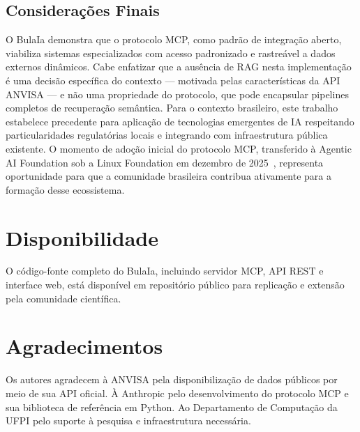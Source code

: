 \documentclass[12pt]{article}
\begin{document}
\subsection{Considerações Finais}

O BulaIa demonstra que o protocolo MCP, como padrão de integração aberto, viabiliza sistemas especializados com acesso padronizado e rastreável a dados externos dinâmicos. Cabe enfatizar que a ausência de RAG nesta implementação é uma decisão específica do contexto --- motivada pelas características da API ANVISA --- e não uma propriedade do protocolo, que pode encapsular pipelines completos de recuperação semântica. Para o contexto brasileiro, este trabalho estabelece precedente para aplicação de tecnologias emergentes de IA respeitando particularidades regulatórias locais e integrando com infraestrutura pública existente. O momento de adoção inicial do protocolo MCP, transferido à Agentic AI Foundation sob a Linux Foundation em dezembro de 2025~\cite{wikipedia2025mcp}, representa oportunidade para que a comunidade brasileira contribua ativamente para a formação desse ecossistema.

\section*{Disponibilidade}

O código-fonte completo do BulaIa, incluindo servidor MCP, API REST e interface web, está disponível em repositório público para replicação e extensão pela comunidade científica.

\section*{Agradecimentos}

Os autores agradecem à ANVISA pela disponibilização de dados públicos por meio de sua API oficial. À Anthropic pelo desenvolvimento do protocolo MCP e sua biblioteca de referência em Python. Ao Departamento de Computação da UFPI pelo suporte à pesquisa e infraestrutura necessária.

\end{document}
